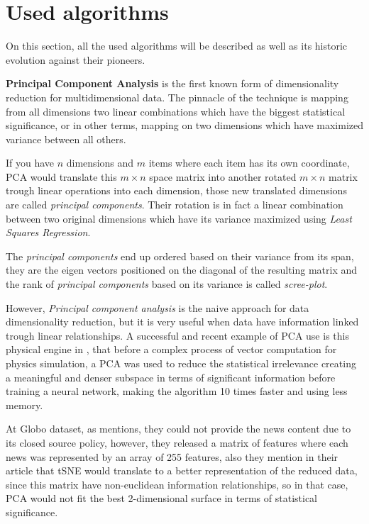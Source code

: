 \documentclass[ecp,tc,english]{iiufrgs}
\begin{document}
    \newpage
    \section{Used algorithms} \label{algorithms}
    
    On this section, all the used algorithms will be described as well as its historic evolution against their pioneers.
        
    \textbf{Principal Component Analysis} \cite{hotelling1933}  is the first known form of dimensionality reduction for multidimensional data. The pinnacle of the technique is mapping from all dimensions two linear combinations which have the biggest statistical significance, or in other terms, mapping on two dimensions which have maximized variance between all others.
    
    If you have \(n\) dimensions and \(m\) items where each item has its own coordinate, PCA would translate this \(m \times n\) space matrix into another rotated \(m \times n\) matrix trough linear operations into each dimension, those new translated dimensions are called \textit{principal components}.
    Their rotation is in fact a linear combination between two original dimensions which have its variance maximized using \textit{Least Squares Regression}.
    
    The \textit{principal components} end up ordered based on their variance from its span, they are the eigen vectors positioned on the diagonal of the resulting matrix and the rank of \textit{principal components} based on its variance is called \textit{scree-plot}.

    However, \textit{Principal component analysis} is the naive approach for data dimensionality reduction, but it is very useful when data have information linked trough linear relationships.
    A successful and recent example of PCA use is this physical engine in \cite{holden2019}, that before a complex process of vector computation for physics simulation, a PCA was used to reduce the statistical irrelevance creating a meaningful and denser subspace in terms of significant information before training a neural network, making the algorithm 10 times faster and using less memory.
    
    At Globo dataset, as \cite{moreira2018} mentions, they could not provide the news content due to its closed source policy, however, they released a matrix of features where each news was represented by an array of 255 features, also they mention in their article that tSNE would translate to a better representation of the reduced data, since this matrix have non-euclidean information relationships, so in that case, PCA would not fit the best 2-dimensional surface in terms of statistical significance.
    
\end{document}
